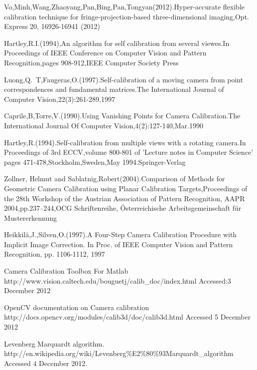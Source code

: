\begin{singlespace}
\begin{thebibliography}{10000000000}
Vo,Minh,Wang,Zhaoyang,Pan,Bing,Pan,Tongyan(2012).Hyper-accurate flexible calibration technique for fringe-projection-based three-dimensional imaging,Opt. Express 20, 16926-16941 (2012) 

Hartley,R.I.(1994),An algorithm for self calibration from several viewes.In Proceedings of IEEE Conference on Computer Vision and Pattern Recognition,pages 908-912,IEEE Computer Society Press 

Luong,Q.~T,Faugeras,O.(1997).Self-calibration of a moving camera from point correspondences and fundamental matrices.The International Journal of Computer Vision,22(3):261-289,1997 

Caprile,B,Torre,V.(1990).Using Vanishing Points for Camera Calibration.The International Journal Of Computer Vision,4(2):127-140,Mar.1990 

Hartley,R.(1994).Self-calibration from multiple views with a rotating camera.In Proceedings of 3rd ECCV,volume 800-801 of 'Lecture notes in Computer Science' pages 471-478,Stockholm,Sweden,May 1994.Springer-Verlag 

Zollner, Helmut and Sablatnig,Robert(2004).Comparison of Methods for Geometric Camera Calibration using Planar Calibration Targets,Proceedings of the 28th Workshop of the Austrian Association of Pattern Recognition, AAPR 2004,pp.237--244,OCG Schriftenreihe, {\"O}sterreichische Arbeitsgemeinschaft f{\"u}r Mustererkennung

Heikkil\"{a},J.,Silven,O.(1997).A Four-Step Camera Calibration Procedure with Implicit Image Correction.
In Proc. of IEEE Computer Vision and Pattern Recognition, pp. 1106-1112, 1997

Camera Calibration Toolbox For Matlab \newline
http://www.vision.caltech.edu/bouguetj/calib\_doc/index.html \newline
Accessed:3 December 2012 

OpenCV documentation on Camera calibration \newline
http://docs.opencv.org/modules/calib3d/doc/calib3d.html \newline
Accessed 5 December 2012

Levenberg Marquardt algorithm.\newline
http://en.wikipedia.org/wiki/Levenberg\%E2\%80\%93Marquardt\_algorithm \newline
Accessed 4 December 2012.


\end{thebibliography}
\end{singlespace}
